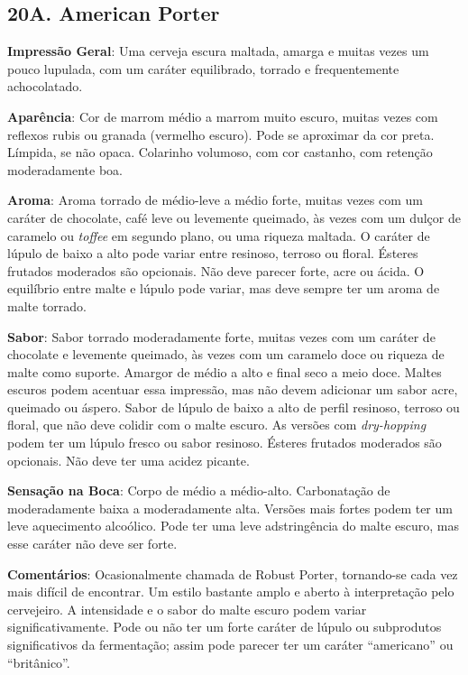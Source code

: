 \subsection*{20A. American Porter}
\textbf{Impressão Geral}: Uma cerveja escura maltada, amarga e muitas vezes um pouco lupulada, com um caráter equilibrado, torrado e frequentemente achocolatado.

\textbf{Aparência}: Cor de marrom médio a marrom muito escuro, muitas vezes com reflexos rubis ou granada (vermelho escuro). Pode se aproximar da cor preta. Límpida, se não opaca. Colarinho volumoso, com cor castanho, com retenção moderadamente boa.

\textbf{Aroma}: Aroma torrado de médio-leve a médio forte, muitas vezes com um caráter de chocolate, café leve ou levemente queimado, às vezes com um dulçor de caramelo ou \textit{toffee} em segundo plano, ou uma riqueza maltada. O caráter de lúpulo de baixo a alto pode variar entre resinoso, terroso ou floral. Ésteres frutados moderados são opcionais. Não deve parecer forte, acre ou ácida. O equilíbrio entre malte e lúpulo pode variar, mas deve sempre ter um aroma de malte torrado.

\textbf{Sabor}: Sabor torrado moderadamente forte, muitas vezes com um caráter de chocolate e levemente queimado, às vezes com um caramelo doce ou riqueza de malte como suporte. Amargor de médio a alto e final seco a meio doce. Maltes escuros podem acentuar essa impressão, mas não devem adicionar um sabor acre, queimado ou áspero. Sabor de lúpulo de baixo a alto de perfil resinoso, terroso ou floral, que não deve colidir com o malte escuro. As versões com \textit{dry-hopping} podem ter um lúpulo fresco ou sabor resinoso. Ésteres frutados moderados são opcionais. Não deve ter uma acidez picante.

\textbf{Sensação na Boca}: Corpo de médio a médio-alto. Carbonatação de moderadamente baixa a moderadamente alta. Versões mais fortes podem ter um leve aquecimento alcoólico. Pode ter uma leve adstringência do malte escuro, mas esse caráter não deve ser forte.

\textbf{Comentários}: Ocasionalmente chamada de Robust Porter, tornando-se cada vez mais difícil de encontrar. Um estilo bastante amplo e aberto à interpretação pelo cervejeiro. A intensidade e o sabor do malte escuro podem variar significativamente. Pode ou não ter um forte caráter de lúpulo ou subprodutos significativos da fermentação; assim pode parecer ter um caráter “americano” ou “britânico”.

